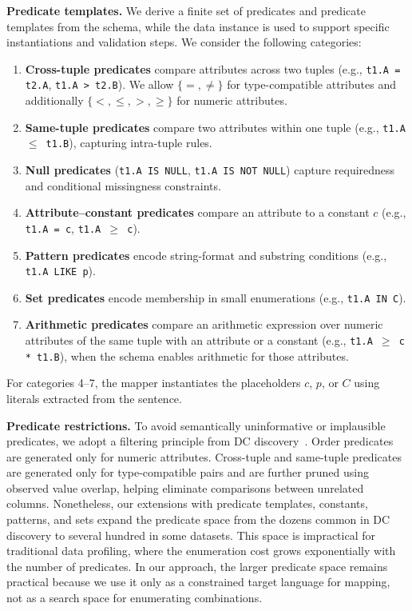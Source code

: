 \smallskip\noindent\textbf{Predicate templates.}
We derive a finite set of predicates and predicate templates from the schema, while the data instance is used to support specific instantiations and validation steps. We consider the following categories:
\begin{enumerate}
    \item \textbf{Cross-tuple predicates} compare attributes across two tuples (e.g., \texttt{t1.A = t2.A}, \texttt{t1.A > t2.B}). We allow $\{=,\neq\}$ for type-compatible attributes and additionally $\{<,\leq,>,\geq\}$ for numeric attributes.
    \item \textbf{Same-tuple predicates} compare two attributes within one tuple (e.g., \texttt{t1.A $\leq$ t1.B}), capturing intra-tuple rules.
    \item \textbf{Null predicates} (\texttt{t1.A IS NULL}, \texttt{t1.A IS NOT NULL}) capture requiredness and conditional missingness constraints.
    \item \textbf{Attribute--constant predicates} compare an attribute to a constant $c$ (e.g., \texttt{t1.A = c}, \texttt{t1.A $\geq$ c}).
    \item \textbf{Pattern predicates} encode string-format and substring conditions (e.g., \texttt{t1.A LIKE p}).
    \item \textbf{Set predicates} encode membership in small enumerations (e.g., \texttt{t1.A IN C}).
    \item \textbf{Arithmetic predicates} compare an arithmetic expression over numeric attributes of the same tuple with an attribute or a constant (e.g., \texttt{t1.A $\geq$ c * t1.B}), when the schema enables arithmetic for those attributes.
\end{enumerate}
For categories 4--7, the mapper instantiates the placeholders $c$, $p$, or $C$ using literals extracted from the sentence.

\smallskip\noindent\textbf{Predicate restrictions.}
To avoid semantically uninformative or implausible predicates, we adopt a filtering principle from DC discovery~\cite{chu2013discovering}. Order predicates are generated only for numeric attributes. Cross-tuple and same-tuple predicates are generated only for type-compatible pairs and are further pruned using observed value overlap, helping eliminate comparisons between unrelated columns.
Nonetheless, our extensions with predicate templates, constants, patterns, and sets expand the predicate space from the dozens common in DC discovery to several hundred in some datasets. This space is impractical for traditional data profiling, where the enumeration cost grows exponentially with the number of predicates. In our approach, the larger predicate space remains practical because we use it only as a constrained target language for mapping, not as a search space for enumerating combinations.


